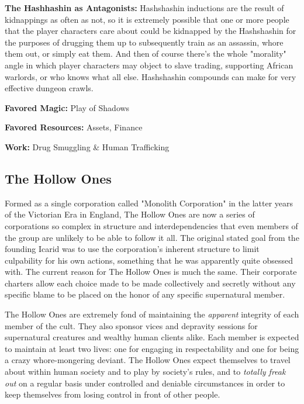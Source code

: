 \textbf{The Hashhashin as Antagonists:} Hashshashin inductions are the result of kidnappings as often as not, so it is extremely possible that one or more people that the player characters care about could be kidnapped by the Hashshashin for the purposes of drugging them up to subsequently train as an assassin, whore them out, or simply eat them. And then of course there's the whole "morality" angle in which player characters may object to slave trading, supporting African warlords, or who knows what all else. Hashshashin compounds can make for very effective dungeon crawls.

\textbf{Favored Magic:} Play of Shadows

\textbf{Favored Resources:} Assets, Finance

\textbf{Work:} Drug Smuggling \& Human Trafficking

\subsection{The Hollow Ones} 

Formed as a single corporation called "Monolith Corporation" in the latter years of the Victorian Era in England, The Hollow Ones are now a series of corporations so complex in structure and interdependencies that even members of the group are unlikely to be able to follow it all. The original stated goal from the founding Icarid was to use the corporation's inherent structure to limit culpability for his own actions, something that he was apparently quite obsessed with. The current reason for The Hollow Ones is much the same. Their corporate charters allow each choice made to be made collectively and secretly without any specific blame to be placed on the honor of any specific supernatural member.

The Hollow Ones are extremely fond of maintaining the \textit{apparent} integrity of each member of the cult. They also sponsor vices and depravity sessions for supernatural creatures and wealthy human clients alike. Each member is expected to maintain at least two lives: one for engaging in respectability and one for being a crazy whore-mongering deviant. The Hollow Ones expect themselves to travel about within human society and to play by society's rules, and to \textit{totally freak out} on a regular basis under controlled and deniable circumstances in order to keep themselves from losing control in front of other people.

